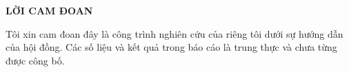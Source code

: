 \begin{center}
\Large\textbf{LỜI CAM ĐOAN}
\end{center}

Tôi xin cam đoan đây là công trình nghiên cứu của riêng tôi dưới sự hướng dẫn của hội đồng. Các số liệu và kết quả trong báo cáo là trung thực và chưa từng được công bố.
